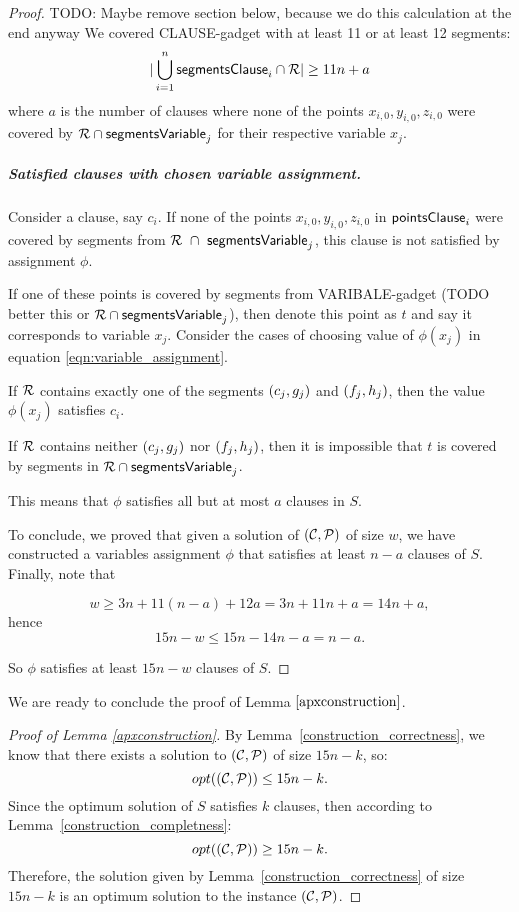 \begin{proof}
TODO: Maybe remove section below, because we do this calculation at the end anyway
We covered CLAUSE-gadget with at least 11 or at least 12 segments:
$$|\bigcup\limits_{i=1}^n \mathsf{segmentsClause}_i \cap \mathcal{R}| \ge 11n + a$$
where $a$ is the number of clauses
where none of the points $x_{i,0}, y_{i,0}, z_{i,0}$
were covered by $\mathcal{R} \cap \mathsf{segmentsVariable}_{j}$ for their respective
variable $x_j$.

\subparagraph{Satisfied clauses with chosen variable assignment.}

Consider a clause, say $c_i$. If none of
the points $x_{i,0}, y_{i,0}, z_{i,0}$ in $\mathsf{pointsClause}_i$ were covered by
segments from $\mathcal{R}~\cap~\mathsf{segmentsVariable}_{j}$,
this clause is not satisfied by assignment $\phi$.

If one of these points is covered by 
segments from VARIBALE-gadget (TODO better this or $\mathcal{R} \cap \mathsf{segmentsVariable}_{j}$),
then denote this point as $t$ and say it corresponds to variable $x_j$.
Consider the cases of choosing value of $\phi(x_j)$
in equation \eqref{eqn:variable_assignment}.

If $\mathcal{R}$ contains exactly one of the segments $(c_{j}, g_{j})$ and $(f_{j}, h_{j})$,
then the value $\phi(x_j)$ satisfies $c_i$.

If $\mathcal{R}$ contains neither $(c_{j}, g_{j})$ nor $(f_{j}, h_{j})$,
then it is impossible that $t$ is covered by segments in $\mathcal{R} \cap \mathsf{segmentsVariable}_{j}$.

This means that $\phi$ satisfies all but at most $a$ clauses in $S$.


To conclude, we proved that given a solution of $(\mathcal{C}, \mathcal{P})$ of size $w$,
we have constructed a variables assignment $\phi$
that satisfies at least $n-a$ clauses of $S$.
Finally, note that

$$w \ge 3n + 11(n-a) + 12a = 3n + 11n + a = 14n + a,$$
hence
$$15n - w  \le 15n - 14n - a = n - a.$$

So $\phi$ satisfies at least $15n-w$ clauses of $S$.
\end{proof}

We are ready to conclude the proof of Lemma $\ref{apxconstruction}$.

\begin{proof}[Proof of Lemma \ref{apxconstruction}]
By Lemma~\ref{construction_correctness}, we know
that there exists a solution to $(\mathcal{C}, \mathcal{P})$ of size $15n-k$, so: 
$$opt((\mathcal{C}, \mathcal{P})) \le 15n - k.$$
Since the optimum solution of $S$ satisfies $k$ clauses,
then according to Lemma~\ref{construction_completness}:
$$opt((\mathcal{C}, \mathcal{P})) \ge 15n -k.$$
Therefore, the solution given by Lemma~\ref{construction_correctness} 
of size $15n - k$ is an optimum solution to the instance $(\mathcal{C}, \mathcal{P})$.
\end{proof}
